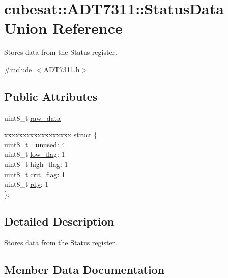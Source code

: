 \hypertarget{unioncubesat_1_1ADT7311_1_1StatusData}{}\section{cubesat\+:\+:A\+D\+T7311\+:\+:Status\+Data Union Reference}
\label{unioncubesat_1_1ADT7311_1_1StatusData}


Stores data from the Status register.  




{\ttfamily \#include $<$A\+D\+T7311.\+h$>$}

\subsection*{Public Attributes}
\begin{DoxyCompactItemize}
\item 
uint8\+\_\+t \hyperlink{unioncubesat_1_1ADT7311_1_1StatusData_a2c067f56a335b5cae9d8c2ab551fa4f3}{raw\+\_\+data}
\item 
\begin{tabbing}
xx\=xx\=xx\=xx\=xx\=xx\=xx\=xx\=xx\=\kill
struct \{\\
\>uint8\_t \hyperlink{unioncubesat_1_1ADT7311_1_1StatusData_aed11f4422847a5e289115510659a5db4}{\_unused}: 4\\
\>uint8\_t \hyperlink{unioncubesat_1_1ADT7311_1_1StatusData_afd952e46bc4414f328004bb7a14a113d}{low\_flag}: 1\\
\>uint8\_t \hyperlink{unioncubesat_1_1ADT7311_1_1StatusData_ac0cac7d8bf777ed78a8ecb98366bba3f}{high\_flag}: 1\\
\>uint8\_t \hyperlink{unioncubesat_1_1ADT7311_1_1StatusData_aa295ce33b62e7627c6cd9a8f64d92a79}{crit\_flag}: 1\\
\>uint8\_t \hyperlink{unioncubesat_1_1ADT7311_1_1StatusData_afd89be5f37bea7e441f750687982d693}{rdy}: 1\\
\}; \\

\end{tabbing}\end{DoxyCompactItemize}


\subsection{Detailed Description}
Stores data from the Status register. 

\subsection{Member Data Documentation}
\mbox{\label{unioncubesat_1_1ADT7311_1_1StatusData_a32f862a77fa292f721b8644e82e439e1}} 
